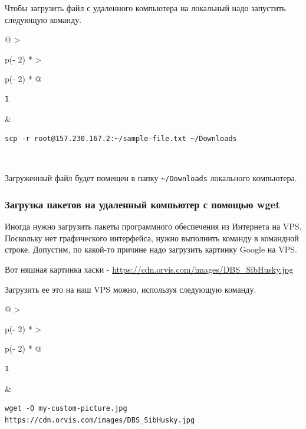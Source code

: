 \documentclass{report}
\begin{document}
Чтобы загрузить файл с удаленного компьютера на локальный надо запустить
следующую команду.

\begin{longtable}[]{@{}
  >{\raggedright\arraybackslash}p{(\columnwidth - 2\tabcolsep) * }
  >{\raggedright\arraybackslash}p{(\columnwidth - 2\tabcolsep) * }@{}}
\toprule
\endhead
\begin{minipage}[t]{\linewidth}\raggedright
\begin{verbatim}
1
\end{verbatim}
\end{minipage} & \begin{minipage}[t]{\linewidth}\raggedright
\begin{verbatim}
scp -r root@157.230.167.2:~/sample-file.txt ~/Downloads
\end{verbatim}
\end{minipage} \\ \addlinespace
\bottomrule
\end{longtable}

Загруженный файл будет помещен в папку
\texttt{\textasciitilde{}/Downloads} локального компьютера.

\hypertarget{Downloading-packages-to-your-remote-machine-with-wget}{%
\subsubsection{\texorpdfstring{\protect\hyperlink{Downloading-packages-to-your-remote-machine-with-wget}{}Загрузка
пакетов на удаленный компьютер с помощью
wget}{Загрузка пакетов на удаленный компьютер с помощью wget}}\label{Downloading-packages-to-your-remote-machine-with-wget}}

Иногда нужно загрузить пакеты программного обеспечения из Интернета на
VPS. Поскольку нет графического интерфейса, нужно выполнить команду в
командной строке. Допустим, по какой-то причине надо загрузить картинку
Google на VPS.

Вот няшная картинка хаски -
\url{https://cdn.orvis.com/images/DBS_SibHusky.jpg}

Загрузить ее это на наш VPS можно, используя следующую команду.

\begin{longtable}[]{@{}
  >{\raggedright\arraybackslash}p{(\columnwidth - 2\tabcolsep) * }
  >{\raggedright\arraybackslash}p{(\columnwidth - 2\tabcolsep) * }@{}}
\toprule
\endhead
\begin{minipage}[t]{\linewidth}\raggedright
\begin{verbatim}
1
\end{verbatim}
\end{minipage} & \begin{minipage}[t]{\linewidth}\raggedright
\begin{verbatim}
wget -O my-custom-picture.jpg https://cdn.orvis.com/images/DBS_SibHusky.jpg
\end{verbatim}
\end{minipage} \\ \addlinespace
\bottomrule
\end{longtable}
\end{document}

